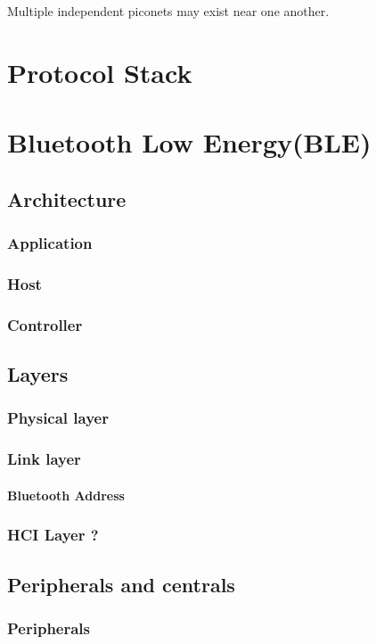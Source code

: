 Multiple independent piconets may exist near one another. 

 

\section{Protocol Stack}


\section{Bluetooth Low Energy(BLE)}
\subsection{Architecture}
\subsubsection{Application}
\subsubsection{Host}
\subsubsection{Controller}

\subsection{Layers}
\subsubsection{Physical layer}
\subsubsection{Link layer}
\paragraph{Bluetooth Address}
\subsubsection{HCI Layer ?}

\subsection{Peripherals and centrals}
\subsubsection{Peripherals}
